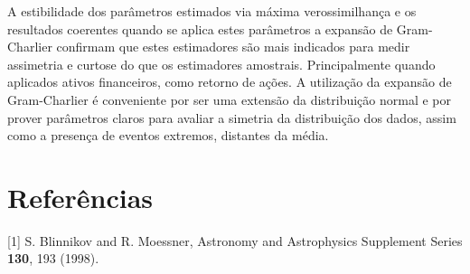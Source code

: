 \documentclass[]{article}
\begin{document}
A estibilidade dos parâmetros estimados via máxima verossimilhança e os
resultados coerentes quando se aplica estes parâmetros a expansão de
Gram-Charlier confirmam que estes estimadores são mais indicados para
medir assimetria e curtose do que os estimadores amostrais.
Principalmente quando aplicados ativos financeiros, como retorno de
ações. A utilização da expansão de Gram-Charlier é conveniente por ser
uma extensão da distribuição normal e por prover parâmetros claros para
avaliar a simetria da distribuição dos dados, assim como a presença de
eventos extremos, distantes da média.

\section*{Referências}\label{referencias}

\hypertarget{refs}{}
\hypertarget{ref-blinnikov1998}{}
{[}1{]} S. Blinnikov and R. Moessner, Astronomy and Astrophysics
Supplement Series \textbf{130}, 193 (1998).
\end{document}
